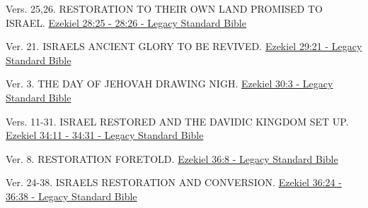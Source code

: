 \documentclass[
  ignorenonframetext,
]{beamer}
\begin{document}
\begin{frame}{28}
\label{section-96}
\begin{block}{Vers. 25,26. RESTORATION TO THEIR OWN LAND PROMISED TO
ISRAEL.}
\label{vers.-2526.-restoration-to-their-own-land-promised-to-israel.}
\href{https://read.lsbible.org/?q=ezek28\%3A25-26}{Ezekiel 28:25 - 28:26
- Legacy Standard Bible}
\end{block}
\end{frame}

\begin{frame}{29}
\label{section-97}
\begin{block}{Ver. 21. ISRAEL\textquotesingle S ANCIENT GLORY TO BE
REVIVED.}
\label{ver.-21.-israels-ancient-glory-to-be-revived.}
\href{https://read.lsbible.org/?q=ezek29\%3A21}{Ezekiel 29:21 - Legacy
Standard Bible}
\end{block}
\end{frame}

\begin{frame}{30}
\label{section-98}
\begin{block}{Ver. 3. THE DAY OF JEHOVAH DRAWING NIGH.}
\label{ver.-3.-the-day-of-jehovah-drawing-nigh.}
\href{https://read.lsbible.org/?q=ezek30\%3A3}{Ezekiel 30:3 - Legacy
Standard Bible}
\end{block}
\end{frame}

\begin{frame}{34}
\label{section-99}
\begin{block}{Vers. 11-31. ISRAEL RESTORED AND THE DAVIDIC KINGDOM SET
UP.}
\label{vers.-11-31.-israel-restored-and-the-davidic-kingdom-set-up.}
\href{https://read.lsbible.org/?q=ezek34\%3A11-31}{Ezekiel 34:11 - 34:31
- Legacy Standard Bible}
\end{block}
\end{frame}

\begin{frame}{36}
\label{section-100}
\begin{block}{Ver. 8. RESTORATION FORETOLD.}
\label{ver.-8.-restoration-foretold.}
\href{https://read.lsbible.org/?q=ezek36\%3A8}{Ezekiel 36:8 - Legacy
Standard Bible}
\end{block}

\begin{block}{Ver. 24-38. ISRAEL\textquotesingle S RESTORATION AND
CONVERSION.}
\label{ver.-24-38.-israels-restoration-and-conversion.}
\href{https://read.lsbible.org/?q=ezek36\%3A24-38}{Ezekiel 36:24 - 36:38
- Legacy Standard Bible}
\end{block}
\end{frame}
\end{document}
